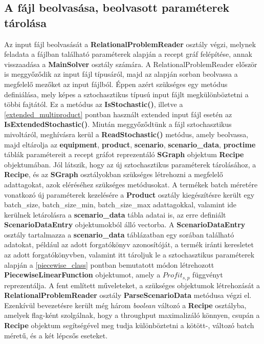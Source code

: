 \subsection{A fájl beolvasása, beolvasott paraméterek tárolása}
Az input fájl beolvasását a \textbf{RelationalProblemReader} osztály végzi, melynek feladata a fájlban található paraméterek alapján a recept gráf felépítése, annak visszaadása a \textbf{MainSolver }osztály számára. A RelationalProblemReader először is meggyőződik az input fájl típusáról, majd az alapján sorban beolvassa a megfelelő mezőket az input fájlból. Éppen azért szükséges egy metódus definiálása, mely képes a sztochasztikus típusú input fájlt megkülönböztetni a többi fajtától. Ez a metódus az \textbf{IsStochastic()}, illetve a \ref{extended_multiproduct} pontban használt extended input fájl esetén az \textbf{IsExtendedStochastic()}. Miután meggyőződtünk a fájl sztochasztikus mivoltáról, meghívásra kerül a \textbf{ReadStochastic()} metódus, amely beolvassa, majd eltárolja az \textbf{equipment}, \textbf{product}, \textbf{scenario}, \textbf{scenario\_data}, \textbf{proctime} táblák paramétereit a recept gráfot reprezentáló \textbf{SGraph} objektum \textbf{Recipe} objektumában. Jól látszik, hogy az új sztochasztikus paraméterek tárolásához, a \textbf{Recipe}, és az \textbf{SGraph} osztályokban szükséges létrehozni a megfelelő adattagokat, azok eléréséhez szükséges metódusokat. A termékek batch méretére vonatkozó új paraméterek kezelésére a \textbf{Product} osztály kiegészítésre került egy batch\_size, batch\_size\_min, batch\_size\_max adattagokkal, valamint ide kerülnek letárolásra a \textbf{scenario\_data} tábla adatai is, az erre definiált \textbf{ScenarioDataEntry} objektumokból álló vectorba. A \textbf{ScenarioDataEntry} osztály tartalmazza a \textbf{scenario\_data} táblázatban egy sorában található adatokat, például az adott forgatókönyv azonosítóját, a termék iránti keresletet az adott forgatókönyvben, valamint itt tároljuk le a sztochasztikus paraméterek alapján a \ref{piecewise_class} pontban bemutatott módon létrehozott \textbf{PiecewiseLinearFunction} objektumot, amely a $Profit_{s,p}$ függvényt reprezentálja. A fent említett műveleteket, a szükséges objektumok létrehozását a \textbf{RelationalProblemReader} osztály \textbf{ParseScenarioData} metódusa végzi el. Ezenkívül bevezetésre került még három \textit{boolean} változó a \textbf{Recipe} osztályba,  amelyek flag-ként szolgálnak, hogy a throughput maximalizáló könnyen, csupán a \textbf{Recipe} objektum segítségével meg tudja különböztetni a kötött-, változó batch méretű, és a két lépcsős eseteket.
